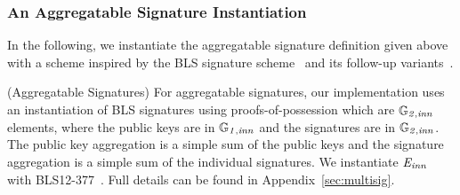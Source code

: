 \subsubsection{An Aggregatable Signature Instantiation}
\label{sec:bls}
\noindent In the following, we instantiate the aggregatable signature definition given above with a scheme inspired by the BLS signature
scheme~\cite{BLS_signatures} and its follow-up variants~\cite{proofs_of_posession,boneh_compact_multisig}.
\vspace{-0.08in}
\begin{construction}(Aggregatable Signatures) 
\label{insta:bls}
For aggregatable signatures, our implementation uses an instantiation of BLS signatures using proofs-of-possession which are $\mathbb{G}_{\mathit{2,inn}}$ elements, 
where the public keys are in $\mathbb{G}_{\mathit{1,inn}}$  and the signatures are in $\mathbb{G}_{\mathit{2,inn}}$. The public key aggregation is a simple sum of the 
public keys and the signature aggregation is a simple sum of the individual signatures. We instantiate $\mathit{E}_{\mathit{inn}}$ with BLS12-377~\cite{zexe}. Full details can be found in Appendix~\ref{sec:multisig}.
 
\begin{comment}
\begin{itemize}
\item $(\ginn{1}, \sginn{1}, \ginn{2}, \sginn{2}, \gtinn, \epinn, \Hinn, \HPoP)$ from $\mathit{pp}$ where 
$\mathit{pp} \leftarrow  \mathit{AS.Setup}(\mathit{aux_{\mathit{AS}}})$, 
where $\ginn{1}$, $\sginn{1}$, $\ginn{2}$, $\sginn{2}$, $\gtinn$, $\epinn$ were defined in Section~\ref{sec:pairings} and 
$\Hinn: \{0,1\}^* \rightarrow \ginn{2}$ and $\HPoP: \{0,1\}^* \rightarrow \ginn{2}$ are two hash functions. 
The auxiliary parameter $\mathit{aux_{\mathit{AS}}}$ is such that there exists $N \in \mathbb{N}$, 
$N$ is the first component of the vector $\mathit{aux_{\mathit{AS}}}$ and there exists a subgroup of size at least $N$ in the multiplicative group of $\mathbb{F}$, where $\mathbb{F}$ 
is the base field of $\einn$, but also the size of the subgroup $\in O(N)$.

\item $(\mathit{pk},\mathit{sk}, \pi_{\PoP}) \leftarrow \mathit{AS.GenKeypair}(\mathit{pp})$, where $\mathit{sk} \xleftarrow{\$} \mathbb{Z}_{r}^{*}$  
and $\mathit{pk} = \mathit{sk} \cdot \sginn{1} \in \ginn{1}$ and $\pi_{\PoP} \leftarrow {\mathit{sk}} \cdot \HPoP(\mathit{pk})$ 
and $r$ was defined in Section~\ref{sec:pairings} as the characteristic of the scalar field of $\einn$.

\item $0/1 \leftarrow \mathit{AS.VerifyPoP}(\mathit{pp}, \mathit{pk}, \pi_{\PoP})$, where $\mathit{AS.VerifyPoP}$ outputs $1$ if 
$$\epinn( \sginn{1}, \pi_{\PoP}) = \epinn(\mathit{pk}, \HPoP(\mathit{pk}))$$ holds and $0$ otherwise. Note that implicitly, as part of running \\
$\mathit{AS.VerifyPoP}$, one checks that $\mathit{pk} \in \ginn{1}$ also holds.


\end{comment}
\end{construction}
